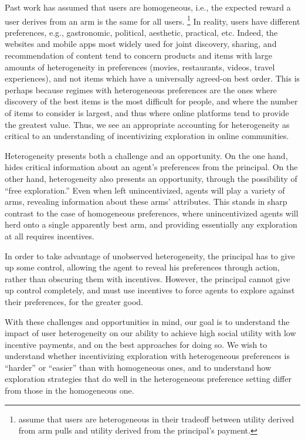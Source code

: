 Past work has assumed that users are homogeneous, i.e., the expected
reward a user derives from an arm is the same for all users.%
\footnote{\citet{han2015incentivizing} assume that users are
heterogeneous in their tradeoff between utility derived from arm pulls
and utility derived from the principal's payment.}
In reality, users have different preferences, e.g., gastronomic,
political, aesthetic, practical, etc.
Indeed, the websites and mobile apps most widely used for joint discovery,
sharing, and recommendation of content tend to concern products and items 
with large amounts of heterogeneity in preferences (movies, restaurants,
videos, travel experiences), and not items which have a universally
agreed-on best order.
This is perhaps because regimes with heterogeneous preferences are the
ones where discovery of the best items is the most difficult for people, and
where the number of items to consider is largest, and thus where online
platforms tend to provide the greatest value.  Thus, we see an appropriate
accounting for heterogeneity as critical to an understanding of incentivizing
exploration in online communities.

Heterogeneity presents both a challenge and an opportunity.
On the one hand,  hides critical
information about an agent's preferences from the principal.
On the other hand, heterogeneity also presents an opportunity, through the
possibility of ``free exploration.''
Even when left unincentivized, agents will
play a variety of arms, revealing information about these arms' attributes.
This stands in sharp contrast to the case of homogeneous preferences, where 
unincentivized agents will herd onto a single apparently best arm, and providing
essentially any exploration at all requires incentives.

In order to take advantage of unobserved heterogeneity, the principal
has to give up some control, allowing the agent to reveal his
preferences through action, rather than obscuring them with incentives.
However, the principal cannot give up control completely,
and must use incentives to force agents to explore against their
preferences, for the greater good. 

With these challenges and opportunities in mind, our goal is to understand the
impact of user heterogeneity on our ability to achieve high social utility with
low incentive payments, and on the best approaches for doing so.
We wish to understand whether incentivizing exploration with
heterogeneous preferences  is ``harder'' or ``easier'' than with
homogeneous ones,
and to understand how exploration strategies that do well in the
heterogeneous preference setting differ from those in the homogeneous one.

